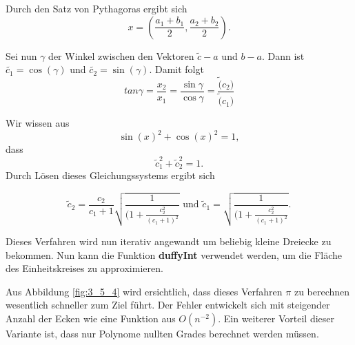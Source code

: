 \documentclass[a4paper,11pt,bibliography=totoc,listof=totoc,headinclude=true,cleardoublepage=empty,oneside]{scrbook}
\begin{document}
\noindent Durch den Satz von Pythagoras ergibt sich
\begin{equation*}
	x=(\frac{a_1+b_1}{2},\frac{a_2+b_2}{2}).
\end{equation*}  

\noindent Sei nun $\gamma$ der Winkel zwischen den Vektoren $\tilde{c}-a$ und $b-a$. Dann ist $\tilde{c_1} = \cos(\gamma)$ und $\tilde{c_2} = \sin(\gamma)$. Damit folgt
\begin{equation}
	tan \gamma = \frac{x_2}{x_1} = \frac{\sin\gamma}{\cos\gamma} = \frac{\tilde(c_2)}{\tilde(c_1)}
\end{equation}

\noindent  Wir wissen aus
\begin{equation*}
	\sin(x)^2+\cos(x)^2=1, 
\end{equation*}
dass 
\begin{equation*}
	\tilde c_1^2+\tilde c_2^2=1.
\end{equation*}
Durch Lösen dieses Gleichungssystems ergibt sich 

\begin{equation*}
	\tilde c_2=\frac{c_2}{c_1+1}\sqrt{\frac{1}{(1+\frac{c_2^2}{(c_1+1)^2}}} \text{ und } \tilde c_1 = \sqrt{\frac{1}{(1+\frac{c_2^2}{(c_1+1)^2}}}.
\end{equation*}

\noindent Dieses Verfahren wird nun iterativ angewandt um beliebig kleine Dreiecke zu bekommen. Nun kann die Funktion \textbf{duffyInt} verwendet werden, um die Fläche des Einheitskreises zu approximieren. 

\begin{minipage}{\textwidth}	
	\color{change}
	\lstset{ 
		language=Matlab, 
		showstringspaces=false}
	 
\end{minipage}

Aus Abbildung \ref{fig:3_5_4} wird ersichtlich, dass dieses Verfahren $\pi$ zu berechnen wesentlich schneller zum Ziel führt. Der Fehler entwickelt sich mit steigender Anzahl der Ecken wie eine Funktion aus $O(n^{-2})$. Ein weiterer Vorteil dieser Variante ist, dass nur Polynome nullten Grades berechnet werden müssen. 
\end{document}
